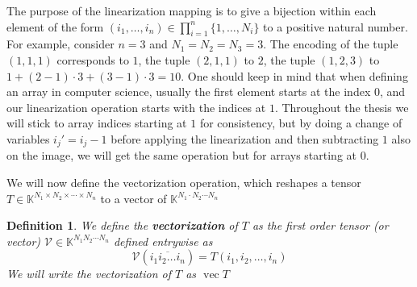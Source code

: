 \documentclass[11pt,a4paper,openright,oneside]{book}
\numberwithin{equation}{section}
\newtheorem{defn0}{Definition}[chapter]
\newenvironment{definition}{ \begin{defn0}}{\end{defn0}}
\DeclareMathOperator{\vectorize}{vec}
\begin{document}
The purpose of the linearization mapping is to give a bijection within each element of the form $(i_1, \dots, i_n) \in \prod_{i=1}^n \{1, \dots, N_i\}$
to a positive natural number. For example, consider $n = 3$ and $N_1 = N_2 = N_3 = 3$. The encoding of the tuple $(1, 1, 1)$ corresponds to $1$,
the tuple $(2, 1, 1)$ to $2$, the tuple $(1, 2, 3)$ to $1 + (2 - 1) \cdot 3 + (3 - 1) \cdot 3 = 10$. One should keep in mind
that when defining an array in computer science, usually the first element starts at the index $0$, and our linearization operation starts with
the indices at $1$. Throughout the thesis we will stick to array indices starting at $1$ for consistency, but by doing a change of variables $i_j' = i_j - 1$
before applying the linearization and then subtracting $1$ also on the image, we will get the same operation but for arrays starting at $0$.

We will now define the vectorization operation, which reshapes a tensor $T \in \mathbb{K}^{N_1 \times N_2 \times \cdots \times N_n}$ to a 
vector of $\mathbb{K}^{N_1 \cdot N_2 \cdots N_n}$


\begin{definition}
    We define the \textbf{vectorization} of $T$
    as the first order tensor (or vector) $\mathcal{V} \in \mathbb{K}^{N_1 N_2 \cdots N_n}$ defined entrywise as
    $$\mathcal{V}(\overline{i_1 i_2 \dots i_n}) = T(i_1, i_2, \dots, i_n)$$
    We will write the vectorization of $T$ as $\vectorize{T}$
\end{definition}
\end{document}
